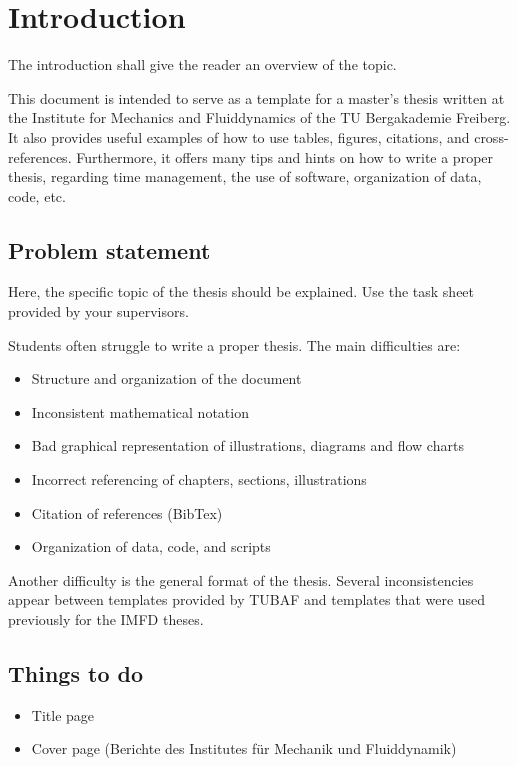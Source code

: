\chapter{Introduction}
\label{ch:Introduction}
The introduction shall give the reader an overview of the topic. 

This document is intended to serve as a template for a master's thesis written at the Institute for Mechanics and Fluiddynamics of the TU Bergakademie Freiberg. It also provides useful examples of how to use tables, figures, citations, and cross-references. Furthermore, it offers many tips and hints on how to write a proper thesis, regarding time management, the use of software, organization of data, code, etc. 

\section{Problem statement}
\label{sec:ProblemStatement}
Here, the specific topic of the thesis should be explained. Use the task sheet provided by your supervisors.

Students often struggle to write a proper thesis. The main difficulties are:
\begin{itemize}
    \item Structure and organization of the document
    \item Inconsistent mathematical notation
    \item Bad graphical representation of illustrations, diagrams and flow charts
    \item Incorrect referencing of chapters, sections, illustrations
    \item Citation of references (BibTex)
    \item Organization of data, code, and scripts
\end{itemize}
Another difficulty is the general format of the thesis. Several inconsistencies appear between templates provided by TUBAF and templates that were used previously for the IMFD theses.

\section{Things to do}
\begin{itemize}
    \item Title page
    \item Cover page (Berichte des Institutes für Mechanik und Fluiddynamik)
\end{itemize}

